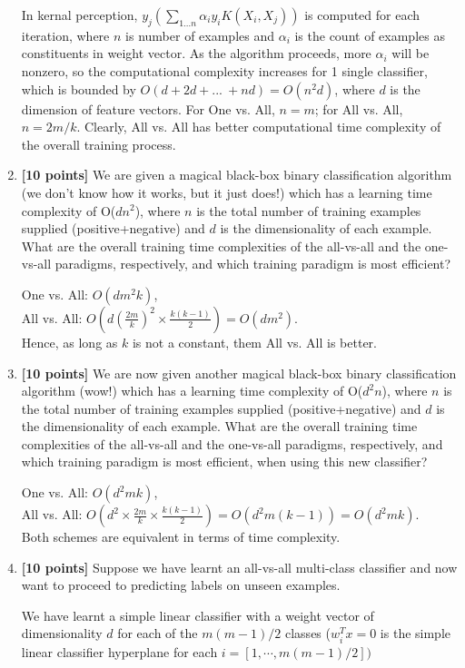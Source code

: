 \documentclass[11pt]{article}
\begin{document}
\begin{enumerate}
In kernal perception, $y_j\left(\sum_{1...n}{\alpha_i y_i K(X_i, X_j)}\right)$ is computed for each iteration, where $n$ is number of examples and $\alpha_i$ is the count of examples as constituents in weight vector. As the algorithm proceeds, more $\alpha_i$ will be nonzero, so the computational complexity increases for 1 single classifier, which is bounded by $O\left(d + 2d + ...\:+ nd\right) = O(n^2 d)$, where $d$ is the dimension of feature vectors. For One vs. All, $n = m$; for All vs. All, $n = 2m/k$. Clearly, All vs. All has better computational time complexity of the overall training process.
\item {\bf [10 points]} We are given a magical black-box binary classification algorithm (we don’t know how it works, but it just does!) which has a learning time complexity of O($dn^2$), where $n$ is the total number of training examples supplied (positive+negative) and $d$ is the dimensionality of each example.
What are the overall training time complexities of the all-vs-all and the one-vs-all
paradigms, respectively, and which training paradigm is most efficient?

One vs. All: $O\left(dm^2k\right)$, \\
All vs. All: $O\left(d\left(\frac{2m}{k}\right)^2 \times \frac{k(k-1)}{2}\right) = O(dm^2)$.\\
Hence, as long as $k$ is not a constant, them All vs. All is better.
\item {\bf [10 points]} We are now given another magical black-box binary classification algorithm (wow!) which has a learning time complexity of O($d^2 n$), where $n$ is the total number of training examples supplied (positive+negative) and $d$ is the dimensionality of each example.
What are the overall training time complexities of the all-vs-all and the one-vs-all paradigms, respectively, and which training paradigm is most efficient, when using this new classifier?

One vs. All: $O\left(d^2mk\right)$, \\
All vs. All: $O\left(d^2\times\frac{2m}{k} \times \frac{k(k-1)}{2}\right) = O(d^2 m(k-1)) = O(d^2mk)$.\\
Both schemes are equivalent in terms of time complexity.

\item {\bf [10 points]} Suppose we have learnt an all-vs-all multi-class classifier and now want to proceed to predicting labels on unseen examples.

We have learnt a simple linear classifier with a weight vector of dimensionality $d$ for each of the $ m(m-1)/2$ classes ($w_i^T x = 0$ is the simple linear classifier hyperplane for each  $i =[1, \cdots , m(m-1)/2] )$


\end{enumerate}
\end{document}
